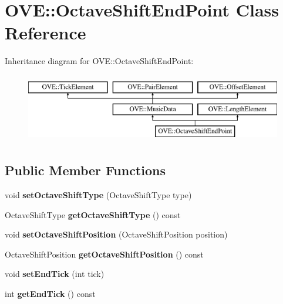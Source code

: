 \hypertarget{class_o_v_e_1_1_octave_shift_end_point}{}\section{O\+VE\+:\+:Octave\+Shift\+End\+Point Class Reference}
\label{class_o_v_e_1_1_octave_shift_end_point}
Inheritance diagram for O\+VE\+:\+:Octave\+Shift\+End\+Point\+:\begin{figure}[H]
\begin{center}
\leavevmode
\includegraphics[height=3.000000cm]{class_o_v_e_1_1_octave_shift_end_point}
\end{center}
\end{figure}
\subsection*{Public Member Functions}
\begin{DoxyCompactItemize}
\item 
\mbox{\label{class_o_v_e_1_1_octave_shift_end_point_a787124e70e3fd09895685f488bfef06e}} 
void {\bfseries set\+Octave\+Shift\+Type} (Octave\+Shift\+Type type)
\item 
\mbox{\label{class_o_v_e_1_1_octave_shift_end_point_ae9d5cb9bd74e4408ccfeddc59fdbd808}} 
Octave\+Shift\+Type {\bfseries get\+Octave\+Shift\+Type} () const
\item 
\mbox{\label{class_o_v_e_1_1_octave_shift_end_point_afd25d9a85226097770596e8ff86e4061}} 
void {\bfseries set\+Octave\+Shift\+Position} (Octave\+Shift\+Position position)
\item 
\mbox{\label{class_o_v_e_1_1_octave_shift_end_point_a438817490082a8ed436ef197cf4815ed}} 
Octave\+Shift\+Position {\bfseries get\+Octave\+Shift\+Position} () const
\item 
\mbox{\label{class_o_v_e_1_1_octave_shift_end_point_a098bcc81c1336a1a655cc15eeaac7388}} 
void {\bfseries set\+End\+Tick} (int tick)
\item 
\mbox{\label{class_o_v_e_1_1_octave_shift_end_point_a3bd8c57b0c24d8a24e7d4491bb6d098b}} 
int {\bfseries get\+End\+Tick} () const
\end{DoxyCompactItemize}
